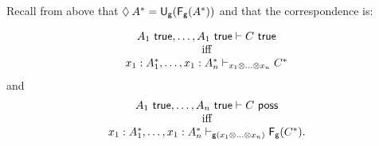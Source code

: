 Recall from above that $\Diamond_{} \, {A}^* =
\mathsf{U}_{\mathsf{g}}(\mathsf{F}_{\mathsf{g}}(A^*))$ and that the correspondence is:
\begin{theorem}
\[
\begin{array}{c}
A_1 \,\, \mathsf{true}, \ldots, A_1 \,\, \mathsf{true} \vdash C \,\, \mathsf{true}\\
\text{iff}\\
x_1:A_1^*,\ldots,x_1:A_n^* \vdash_{x_1\otimes\ldots\otimes x_n} C^*
\end{array}
\]
and 
\[
\begin{array}{c}
A_1 \,\, \mathsf{true}, \ldots, A_n \,\, \mathsf{true} \vdash C \,\, \mathsf{poss}\\
\text{iff}\\
x_1:A_1^*,\ldots,x_1:A_n^* \vdash_{\mathsf{g}(x_1\otimes\ldots\otimes x_n)} \mathsf{F}_{\mathsf{g}}(C^*).
\end{array}
\]
\end{theorem}

